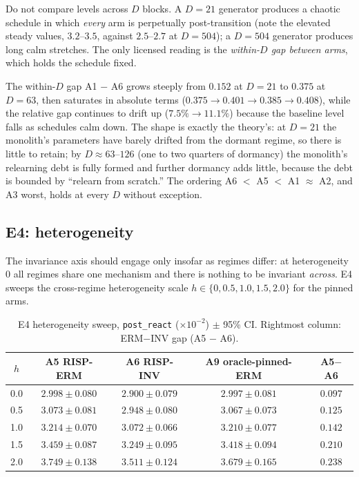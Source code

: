 \documentclass[11pt,a4paper]{article}
\theoremstyle{definition}
\theoremstyle{plain}
\begin{document}
\begin{warning}
Do not compare levels across $D$ blocks. A $D = 21$ generator produces a
chaotic schedule in which \emph{every} arm is perpetually post-transition
(note the elevated steady values, $3.2$--$3.5$, against $2.5$--$2.7$ at
$D = 504$); a $D = 504$ generator produces long calm stretches. The only
licensed reading is the \emph{within-$D$ gap between arms}, which holds the
schedule fixed.
\end{warning}

The within-$D$ gap A1 $-$ A6 grows steeply from $0.152$ at $D = 21$ to
$0.375$ at $D = 63$, then saturates in absolute terms
($0.375 \to 0.401 \to 0.385 \to 0.408$), while the relative gap continues
to drift up ($7.5\% \to 11.1\%$) because the baseline level falls as
schedules calm down. The shape is exactly the theory's: at $D = 21$ the
monolith's parameters have barely drifted from the dormant regime, so there
is little to retain; by $D \approx 63$--$126$ (one to two quarters of
dormancy) the monolith's relearning debt is fully formed and further
dormancy adds little, because the debt is bounded by ``relearn from
scratch.'' The ordering A6 $<$ A5 $<$ A1 $\approx$ A2, and A3 worst, holds
at every $D$ without exception.

\subsection{E4: heterogeneity}
\label{sec:dd5-e4}

The invariance axis should engage only insofar as regimes differ: at
heterogeneity $0$ all regimes share one mechanism and there is nothing to be
invariant \emph{across}. E4 sweeps the cross-regime heterogeneity scale
$h \in \{0, 0.5, 1.0, 1.5, 2.0\}$ for the pinned arms.

\begin{table}[h]
\centering
\caption{E4 heterogeneity sweep, \texttt{post\_react} ($\times 10^{-2}$)
$\pm$ 95\% CI. Rightmost column: ERM$-$INV gap (A5 $-$ A6).}
\label{tab:dd5-e4}
\small
\begin{tabular}{ccccc}
\toprule
$h$ & A5 RISP-ERM & A6 RISP-INV & A9 oracle-pinned-ERM & A5$-$A6 \\
\midrule
0.0 & $2.998 \pm 0.080$ & $2.900 \pm 0.079$ & $2.997 \pm 0.081$ & $0.097$ \\
0.5 & $3.073 \pm 0.081$ & $2.948 \pm 0.080$ & $3.067 \pm 0.073$ & $0.125$ \\
1.0 & $3.214 \pm 0.070$ & $3.072 \pm 0.066$ & $3.210 \pm 0.077$ & $0.142$ \\
1.5 & $3.459 \pm 0.087$ & $3.249 \pm 0.095$ & $3.418 \pm 0.094$ & $0.210$ \\
2.0 & $3.749 \pm 0.138$ & $3.511 \pm 0.124$ & $3.679 \pm 0.165$ & $0.238$ \\
\bottomrule
\end{tabular}
\end{table}
\end{document}
